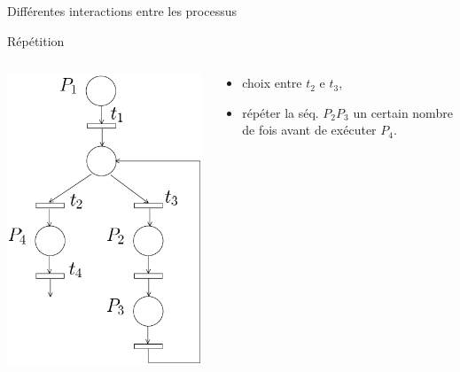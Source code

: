 \documentclass[compress]{beamer}
\begin{document}
\begin{frame}{Différentes interactions entre les processus}
\begin{block}{Répétition}
\begin{columns}
	\begin{column}{.3\linewidth}
		\begin{center}
			\includegraphics[width=\linewidth]{rep}
		\end{center}
	\end{column}
	\begin{column}{.7\linewidth}
		\begin{itemize}
		\item choix entre $t_2$ e $t_3$,
		\item répéter la séq. $P_2P_3$ un certain nombre de fois avant de exécuter $P_4$.
		\end{itemize}
	\end{column}
\end{columns}
\end{block}
\end{frame}
\end{document}
